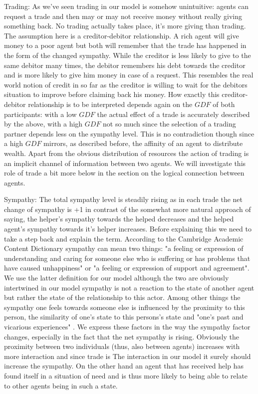 \documentclass{JASSS}
\newcommand{\gdf}{\mathit{GDF}}
\begin{document}
\begin{description*}
		\item[Trading:]
			As we've seen trading in our model is somehow unintuitive: agents can request a trade and then may or may not receive money without really giving something back. No trading actually takes place, it's more giving than trading. The assumption here is a creditor-debitor relationship. A rich agent will give money to a poor agent but both will remember that the trade has happened in the form of the changed sympathy. While the creditor is less likely to give to the same debitor many times, the debitor remembers his debt towards the creditor and is more likely to give him money in case of a request. This resembles the real world notion of credit in so far as the creditor is willing to wait for the debitors situation to improve before claiming back his money. How exactly this creditor-debitor relationship is to be interpreted depends again on the $\gdf$ of both participants: with a low $\gdf$ the actual effect of a trade is accurately described by the above, with a high $\gdf$ not so much since the selection of a trading partner depends less on the sympathy level. This is no contradiction though since a high $\gdf$ mirrors, as described before, the affinity of an agent to distribute wealth. Apart from the obvious distribution of resources the action of trading is an implicit channel of information between two agents. We will investigate this role of trade a bit more below in the section on the logical connection between agents.
			
		\item[Sympathy:]
			The total sympathy level is steadily rising as in each trade the net change of sympathy is +1 in contrast of the somewhat more natural approach of saying, the helper's sympathy towards the helped decreases and the helped agent's sympathy towards it's helper increases. Before explaining this we need to take a step back and explain the term. According to the Cambridge Academic Content Dictionary sympathy can mean two things: "a feeling or expression of understanding and caring for someone else who is suffering or has problems that have caused unhappiness" or "a feeling or expression of support and agreement". We use the latter definition for our model although the two are obviously intertwined in our model sympathy is not a reaction to the state of another agent but rather the state of the relationship to this actor. Among other things the sympathy one feels towards someone else is influenced by the proximity to this person, the similarity of one's state to this persons's state and "one's past and vicarious experiences" \citep{lowenstein}. We express these factors in the way the sympathy factor changes, especially in the fact that the net sympathy is rising. Obviously the proximity between two individuals (thus, also between agents) increases with more interaction and since trade is The interaction in our model it surely should increase the sympathy. On the other hand an agent that has received help has found itself in a situation of need and is thus more likely to being able to relate to other agents being in such a state. 
	\end{description*}
	
\end{document}
